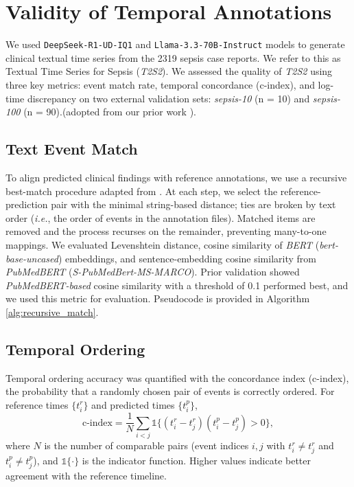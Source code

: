 \section{Validity of Temporal Annotations}
\label{apd:tts_validity}


We used \texttt{DeepSeek-R1-UD-IQ1} and \texttt{Llama-3.3-70B-Instruct} models to generate clinical textual time series from
the 2319 sepsis case reports. We refer to this as Textual
Time Series for Sepsis (\textit{T2S2}). We assessed the quality of \textit{T2S2} using three key metrics: event match rate, temporal concordance (c-index), and log-time discrepancy on two external validation sets: \textit{sepsis-10} (n = 10) and \textit{sepsis-100} (n = 90).(adopted from our prior work \cite{wang2025large}).

\subsection*{Text Event Match}
To align predicted clinical findings with reference annotations, we use a recursive best-match procedure adapted from \citep{wang2025large}. At each step, we select the reference-prediction pair with the minimal string-based distance; ties are broken by text order (\emph{i.e.}, the order of events in the annotation files). Matched items are removed and the process recurses on the remainder, preventing many-to-one mappings. We evaluated Levenshtein distance, cosine similarity of \textit{BERT} (\textit{bert-base-uncased}) embeddings, and sentence-embedding cosine similarity from \textit{PubMedBERT} (\textit{S-PubMedBert-MS-MARCO}). Prior validation showed \textit{PubMedBERT-based} cosine similarity with a threshold of 0.1 performed best, and we used this metric for evaluation. Pseudocode is provided in Algorithm \ref{alg:recursive_match}.

%

\subsection*{Temporal Ordering}
Temporal ordering accuracy was quantified with the concordance index (c-index), the probability that a randomly chosen pair of events is correctly ordered. For reference times $\{t^r_i\}$ and predicted times $\{t^p_i\}$,
\[
\text{c-index}=\frac{1}{N}\sum_{i<j}\mathds{1}\{(t^r_i-t^r_j)(t^p_i-t^p_j)>0\},
\]
where $N$ is the number of comparable pairs (event indices $i,j$ with $t^r_i\neq t^r_j$ and $t^p_i\neq t^p_j$), and $\mathds{1}\{\cdot\}$ is the indicator function. Higher values indicate better agreement with the reference timeline.
 



